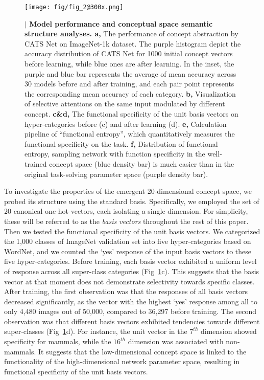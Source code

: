 \documentclass[pdflatex,sn-mathphys-num,lineno]{sn-jnl}%
\begin{document}
\begin{CJK}{UTF8}{gbsn}
\begin{figure}[htbp]
\centering
\texttt{[image: fig/fig\_2@300x.png]}
\caption{\textbf{$\vert$ Model performance and conceptual space semantic structure analyses. a,} The performance of concept abstraction by CATS Net on ImageNet-1k dataset. The purple histogram depict the accuracy distribution of CATS Net for 1000 initial concept vectors before learning, while blue ones are after learning.  In the inset,  the purple and blue bar represents the average of mean accuracy across 30 models before and after training, and each pair point represents the corresponding mean accuracy of each category. \textbf{b,} Visualization of selective attentions on the same input modulated by different concept. \textbf{c\&d,} The functional specificity of the unit basis vectors on hyper-categories before (c) and after learning (d). \textbf{e,} Calculation pipeline of “functional entropy”, which quantitatively measures the functional specificity on the task. \textbf{f,} Distribution of functional entropy, sampling network with function specificity in the well-trained concept space (blue density bar) is much easier than in the original task-solving parameter space (purple density bar).}
\label{fig2}
\end{figure}

To investigate the properties of the emergent 20-dimensional concept space, we probed its structure using the standard basis. Specifically, we employed the set of 20 canonical one-hot vectors, each isolating a single dimension. For simplicity, these will be referred to as the \textit{basis vectors} throughout the rest of this paper. Then we tested the functional specificity of the unit basis vectors. We categorized the 1,000 classes of ImageNet validation set into five hyper-categories based on WordNet, and we counted the ‘yes’ response of the input basis vectors to these five hyper-categories. Before training, each basis vector exhibited a uniform level of response across all super-class categories (Fig~\ref{fig2}c). This suggests that the basis vector at that moment does not demonstrate selectivity towards specific classes. After training, the first observation was that the responses of all basis vectors decreased significantly, as the vector with the highest ‘yes’ response among all to only 4,480 images out of 50,000, compared to 36,297 before training. The second observation was that different basis vectors exhibited tendencies towards different super-classes (Fig~\ref{fig2}d). For instance, the unit vector in the $7^{th}$ dimension showed specificity for mammals, while the $16^{th}$ dimension was associated with non-mammals. It suggests that the low-dimensional concept space is linked to the functionality of the high-dimensional network parameter space, resulting in functional specificity of the unit basis vectors. 


\end{CJK}
\end{document}
